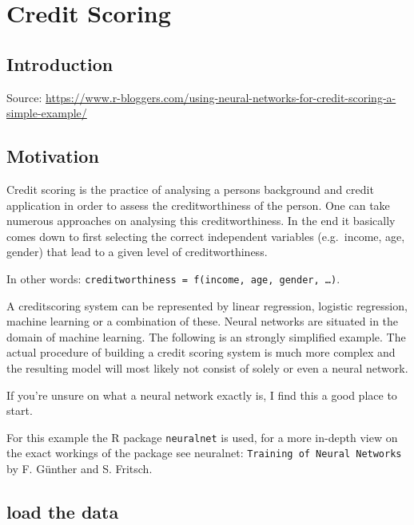 \documentclass[]{book}
\begin{document}
\hypertarget{credit-scoring}{%
\chapter{Credit Scoring}\label{credit-scoring}}

\hypertarget{introduction-1}{%
\section{Introduction}\label{introduction-1}}

Source: \url{https://www.r-bloggers.com/using-neural-networks-for-credit-scoring-a-simple-example/}

\hypertarget{motivation}{%
\section{Motivation}\label{motivation}}

Credit scoring is the practice of analysing a persons background and credit application in order to assess the creditworthiness of the person. One can take numerous approaches on analysing this creditworthiness. In the end it basically comes down to first selecting the correct independent variables (e.g.~income, age, gender) that lead to a given level of creditworthiness.

In other words: \texttt{creditworthiness\ =\ f(income,\ age,\ gender,\ \ldots{})}.

A creditscoring system can be represented by linear regression, logistic regression, machine learning or a combination of these. Neural networks are situated in the domain of machine learning. The following is an strongly simplified example. The actual procedure of building a credit scoring system is much more complex and the resulting model will most likely not consist of solely or even a neural network.

If you're unsure on what a neural network exactly is, I find this a good place to start.

For this example the R package \texttt{neuralnet} is used, for a more in-depth view on the exact workings of the package see neuralnet: \texttt{Training\ of\ Neural\ Networks} by F. Günther and S. Fritsch.

\hypertarget{load-the-data}{%
\section{load the data}\label{load-the-data}}
\end{document}
